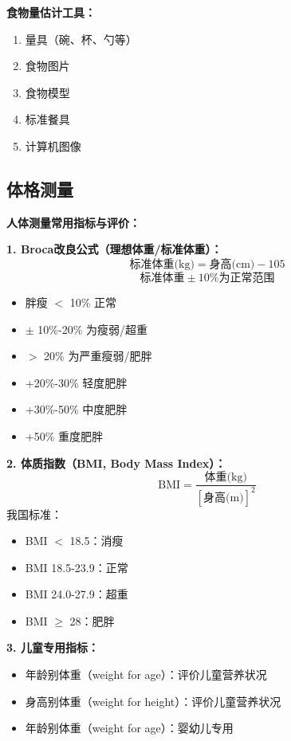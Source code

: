 \begin{defbox}
\textbf{食物量估计工具：}
\begin{enumerate}[leftmargin=*]
    \item 量具（碗、杯、勺等）
    \item 食物图片
    \item 食物模型
    \item 标准餐具
    \item 计算机图像
\end{enumerate}
\end{defbox}

\subsection{体格测量}

\begin{keybox}
\textbf{人体测量常用指标与评价：}

\textbf{1. Broca改良公式（理想体重/标准体重）：}
\[
\text{标准体重(kg)} = \text{身高(cm)} - 105
\]
\[
\text{标准体重} \pm 10\% \text{为正常范围}
\]
\begin{itemize}[leftmargin=*]
    \item 胖瘦 $<$ 10\% 正常
    \item $\pm$ 10\%-20\% 为瘦弱/超重
    \item $>$ 20\% 为严重瘦弱/肥胖
    \item +20\%-30\% 轻度肥胖
    \item +30\%-50\% 中度肥胖
    \item +50\% 重度肥胖
\end{itemize}

\textbf{2. 体质指数（BMI, Body Mass Index）：}
\[
\text{BMI} = \frac{\text{体重(kg)}}{[\text{身高(m)}]^{2}}
\]
我国标准：
\begin{itemize}[leftmargin=*]
    \item BMI $<$ 18.5：消瘦
    \item BMI 18.5-23.9：正常
    \item BMI 24.0-27.9：超重
    \item BMI $\ge$ 28：肥胖
\end{itemize}

\textbf{3. 儿童专用指标：}
\begin{itemize}[leftmargin=*]
    \item 年龄别体重（weight for age）：评价儿童营养状况
    \item 身高别体重（weight for height）：评价儿童营养状况
    \item 年龄别体重（weight for age）：婴幼儿专用
\end{itemize}
\end{keybox}

